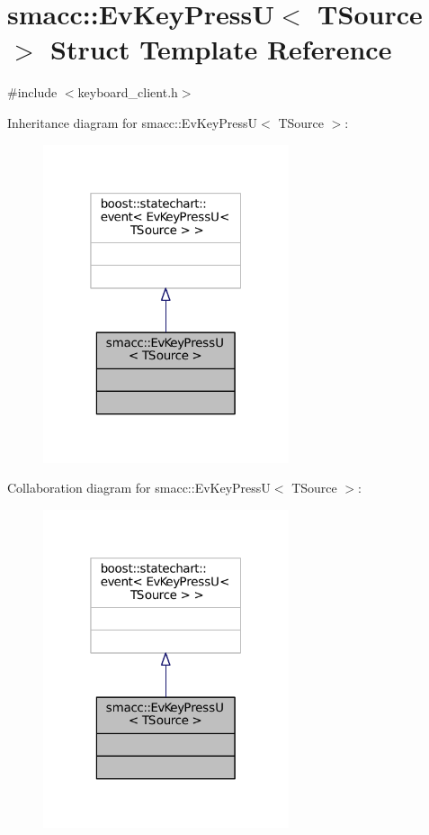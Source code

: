 \hypertarget{structsmacc_1_1EvKeyPressU}{}\section{smacc\+:\+:Ev\+Key\+PressU$<$ T\+Source $>$ Struct Template Reference}
\label{structsmacc_1_1EvKeyPressU}


{\ttfamily \#include $<$keyboard\+\_\+client.\+h$>$}



Inheritance diagram for smacc\+:\+:Ev\+Key\+PressU$<$ T\+Source $>$\+:
\nopagebreak
\begin{figure}[H]
\begin{center}
\leavevmode
\includegraphics[width=205pt]{structsmacc_1_1EvKeyPressU__inherit__graph}
\end{center}
\end{figure}


Collaboration diagram for smacc\+:\+:Ev\+Key\+PressU$<$ T\+Source $>$\+:
\nopagebreak
\begin{figure}[H]
\begin{center}
\leavevmode
\includegraphics[width=205pt]{structsmacc_1_1EvKeyPressU__coll__graph}
\end{center}
\end{figure}


